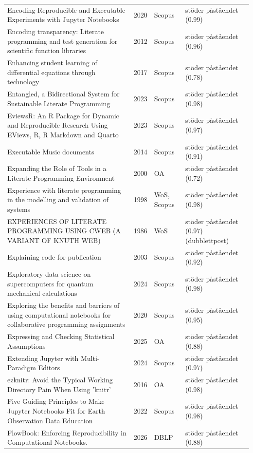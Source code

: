 \begin{longtable}{@{}%
  >{\raggedright\arraybackslash}p{}c%
  >{\raggedright\arraybackslash}p{}%
  >{\raggedright\arraybackslash}p{}@{}}
Encoding Reproducible and Executable Experiments with Jupyter Notebooks & 2020 & Scopus & stöder påståendet (0.99) \\
Encoding transparency: Literate programming and test generation for scientific function libraries & 2012 & Scopus & stöder påståendet (0.96) \\
Enhancing student learning of differential equations through technology & 2017 & Scopus & stöder påståendet (0.78) \\
Entangled, a Bidirectional System for Sustainable Literate Programming & 2023 & Scopus & stöder påståendet (0.98) \\
EviewsR: An R Package for Dynamic and Reproducible Research Using EViews, R, R Markdown and Quarto & 2023 & Scopus & stöder påståendet (0.97) \\
Executable Music documents & 2014 & Scopus & stöder påståendet (0.91) \\
Expanding the Role of Tools in a Literate Programming Environment & 2000 & OA & stöder påståendet (0.72) \\
Experience with literate programming in the modelling and validation of systems & 1998 & WoS, Scopus & stöder påståendet (0.98) \\
EXPERIENCES OF LITERATE PROGRAMMING USING CWEB (A VARIANT OF KNUTH WEB) & 1986 & WoS & stöder påståendet (0.97) (dubblettpost) \\
Explaining code for publication & 2003 & Scopus & stöder påståendet (0.92) \\
Exploratory data science on supercomputers for quantum mechanical calculations & 2024 & Scopus & stöder påståendet (0.98) \\
Exploring the benefits and barriers of using computational notebooks for collaborative programming assignments & 2020 & Scopus & stöder påståendet (0.95) \\
Expressing and Checking Statistical Assumptions & 2025 & OA & stöder påståendet (0.88) \\
Extending Jupyter with Multi-Paradigm Editors & 2024 & Scopus & stöder påståendet (0.97) \\
ezknitr: Avoid the Typical Working Directory Pain When Using 'knitr' & 2016 & OA & stöder påståendet (0.98) \\
Five Guiding Principles to Make Jupyter Notebooks Fit for Earth Observation Data Education & 2022 & Scopus & stöder påståendet (0.98) \\
FlowBook: Enforcing Reproducibility in Computational Notebooks. & 2026 & DBLP & stöder påståendet (0.88) \\

\end{longtable}
